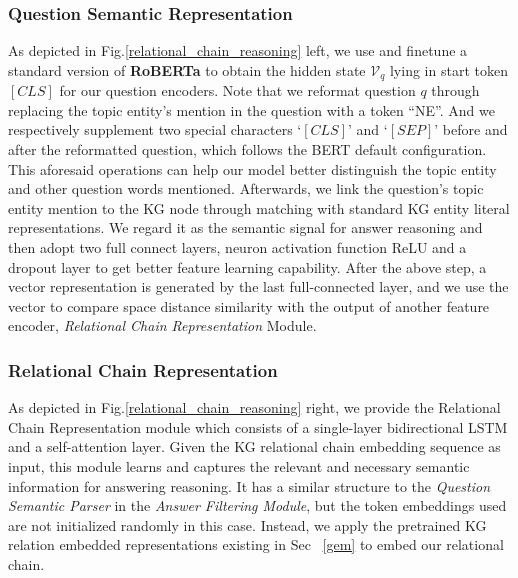 \documentclass[pdflatex,sn-mathphys]{sn-jnl}%
\theoremstyle{thmstyleone}%
\theoremstyle{thmstyletwo}%
\theoremstyle{thmstylethree}%
\begin{document}
\subsubsection{Question Semantic Representation}
As depicted in Fig.\ref{relational_chain_reasoning} left, we use and finetune a standard version of \textbf{RoBERTa} to obtain the hidden state $\mathcal{V}_{q}$ lying in start token $[CLS]$ for our question encoders. Note that we reformat question $q$ through replacing the topic entity's mention in the question with a token ``NE''. And we respectively supplement two special characters `$[CLS]$' and `$[SEP]$' before and after the reformatted question, which follows the BERT default configuration. This aforesaid operations can help our model better distinguish the topic entity and other question words mentioned. Afterwards, we link the question's topic entity mention to the KG node through matching with standard KG entity literal representations. We regard it as the semantic signal for answer reasoning and then adopt two full connect layers, neuron activation function ReLU \cite{relupaper} and a dropout layer to get better feature learning capability. After the above step, a vector representation is generated by the last full-connected layer, and we use the vector to compare space distance similarity with the output of another feature encoder, \textit{Relational Chain Representation} Module.


\subsubsection{Relational Chain Representation}
As depicted in Fig.\ref{relational_chain_reasoning} right, we provide the Relational Chain Representation module which consists of a single-layer bidirectional LSTM and a self-attention layer. Given the KG relational chain embedding sequence as input, this module learns and captures the relevant and necessary semantic information for answering reasoning. It has a similar structure to the \textit{Question Semantic Parser} in the \textit{Answer Filtering Module}, but the token embeddings used are not initialized randomly in this case. Instead, we apply the pretrained KG relation embedded representations existing in Sec ~\ref{gem} to embed our relational chain.
\end{document}
